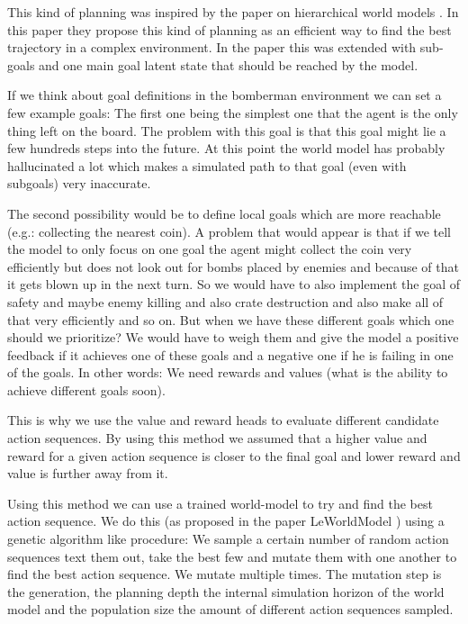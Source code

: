\documentclass[article, 10pt]{IEEEtran}
\begin{document}
This kind of planning was inspired by the paper on hierarchical world models \cite{zhang2026hwm}. In this paper they propose this kind of planning as an efficient way to find the best trajectory in a complex environment. In the paper this was extended with sub-goals and one main goal latent state that should be reached by the model. 

If we think about goal definitions in the bomberman environment we can set a few example goals: The first one being the simplest one that the agent is the only thing left on the board. The problem with this goal is that this goal might lie a few hundreds steps into the future. At this point the world model has probably hallucinated a lot which makes a simulated path to that goal (even with subgoals) very inaccurate. 

The second possibility would be to define local goals which are more reachable (e.g.: collecting the nearest coin). A problem that would appear is that if we tell the model to only focus on one goal the agent might collect the coin very efficiently but does not look out for bombs placed by enemies and because of that it gets blown up in the next turn. So we would have to also implement the goal of safety and maybe enemy killing and also crate destruction and also make all of that very efficiently and so on. But when we have these different goals which one should we prioritize? We would have to weigh them and give the model a positive feedback if it achieves one of these goals and a negative one if he is failing in one of the goals. In other words: We need rewards and values (what is the ability to achieve different goals soon). 

This is why we use the value and reward heads to evaluate different candidate action sequences. By using this method we assumed that a higher value and reward for a given action sequence is closer to the final goal and lower reward and value is further away from it.

Using this method we can use a trained world-model to try and find the best action sequence. We do this (as proposed in the paper LeWorldModel \cite{maes2026leworldmodelstableendtoendjointembedding}) using a genetic algorithm like procedure: We sample a certain number of random action sequences text them out, take the best few and mutate them with one another to find the best action sequence. We mutate multiple times. The mutation step is the generation, the planning depth the internal simulation horizon of the world model and the population size the amount of different action sequences sampled.
\end{document}
